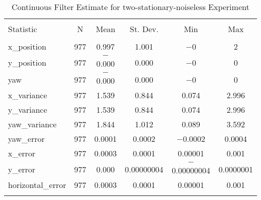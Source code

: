 
\begin{table}[h] \centering 
  \caption{Continuous Filter Estimate for two-stationary-noiseless Experiment} 
  \label{tab:two_stationary_noiseless_continuous_summary} 
\begin{tabular}{@{\extracolsep{5pt}}lccccc} 
\\[-1.8ex]\hline 
\hline \\[-1.8ex] 
Statistic & \multicolumn{1}{c}{N} & \multicolumn{1}{c}{Mean} & \multicolumn{1}{c}{St. Dev.} & \multicolumn{1}{c}{Min} & \multicolumn{1}{c}{Max} \\ 
\hline \\[-1.8ex] 
x\_position & 977 & 0.997 & 1.001 & $-$0 & 2 \\ 
y\_position & 977 & $-$0.000 & 0.000 & $-$0 & 0 \\ 
yaw & 977 & $-$0.000 & 0.000 & $-$0 & 0 \\ 
x\_variance & 977 & 1.539 & 0.844 & 0.074 & 2.996 \\ 
y\_variance & 977 & 1.539 & 0.844 & 0.074 & 2.996 \\ 
yaw\_variance & 977 & 1.844 & 1.012 & 0.089 & 3.592 \\ 
yaw\_error & 977 & 0.0001 & 0.0002 & $-$0.0002 & 0.0004 \\ 
x\_error & 977 & 0.0003 & 0.0001 & 0.00001 & 0.001 \\ 
y\_error & 977 & 0.000 & 0.00000004 & $-$0.00000004 & 0.0000001 \\ 
horizontal\_error & 977 & 0.0003 & 0.0001 & 0.00001 & 0.001 \\ 
\hline \\[-1.8ex] 
\end{tabular} 
\end{table} 
